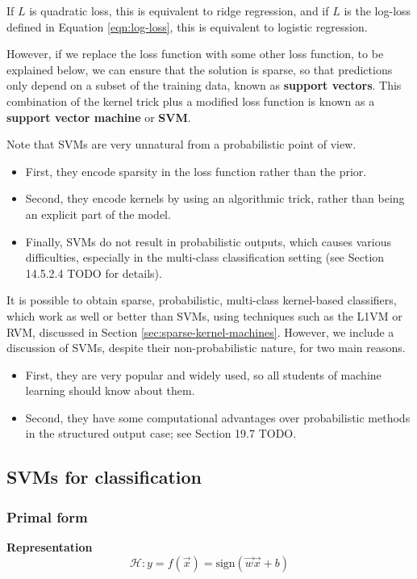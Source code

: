 If $L$ is quadratic loss, this is equivalent to ridge regression, and if $L$ is the log-loss defined in Equation \ref{eqn:log-loss}, this is equivalent to logistic regression.

However, if we replace the loss function with some other loss function, to be explained below, we can ensure that the solution is sparse, so that predictions only depend on a subset of the training data, known as \textbf{support vectors}. This combination of the kernel trick plus a modified loss function is known as a \textbf{support vector machine} or \textbf{SVM}. 

Note that SVMs are very unnatural from a probabilistic point of view. 
\begin{itemize}
\item{First, they encode sparsity in the loss function rather than the prior.}
\item{Second, they encode kernels by using an algorithmic trick, rather than being an explicit part of the model. }
\item{Finally, SVMs do not result in probabilistic outputs, which causes various difficulties, especially in the multi-class classification setting (see Section 14.5.2.4 TODO for details).}
\end{itemize}

It is possible to obtain sparse, probabilistic, multi-class kernel-based classifiers, which work as well or better than SVMs, using techniques such as the L1VM or RVM, discussed in Section \ref{sec:sparse-kernel-machines}. However, we include a discussion of SVMs, despite their non-probabilistic nature, for two main reasons. 
\begin{itemize}
\item{First, they are very popular and widely used, so all students of machine learning should know about them.}
\item{Second, they have some computational advantages over probabilistic methods in the structured output case; see Section 19.7 TODO.}
\end{itemize}


\subsection{SVMs for classification}


\subsubsection{Primal form}
\textbf{Representation}
\begin{equation}
\mathcal{H}:y=f(\vec{x})=\text{sign}(\vec{w}\vec{x}+b)
\end{equation}

